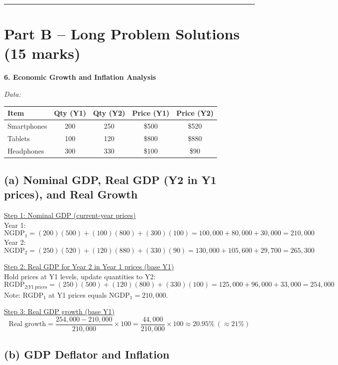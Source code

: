 \documentclass[12pt]{article}
\begin{document}
\vspace{0.5em}
\hrule
\vspace{0.5em}

\section*{Part B – Long Problem Solutions (15 marks)}

\textbf{6. Economic Growth and Inflation Analysis}

\textit{Data:}\\
\begin{tabular}{lcccc}
\toprule
Item & Qty (Y1) & Qty (Y2) & Price (Y1) & Price (Y2) \\
\midrule
Smartphones & 200 & 250 & \$500 & \$520 \\
Tablets     & 100 & 120 & \$800 & \$880 \\
Headphones  & 300 & 330 & \$100 & \$90 \\
\bottomrule
\end{tabular}

\subsection*{(a) Nominal GDP, Real GDP (Y2 in Y1 prices), and Real Growth}

\underline{Step 1: Nominal GDP (current-year prices)} \\
Year 1:
\[
\text{NGDP}_1 = (200)(500) + (100)(800) + (300)(100)
= 100{,}000 + 80{,}000 + 30{,}000 = \boxed{210{,}000}
\]
Year 2:
\[
\text{NGDP}_2 = (250)(520) + (120)(880) + (330)(90)
= 130{,}000 + 105{,}600 + 29{,}700 = \boxed{265{,}300}
\]

\underline{Step 2: Real GDP for Year 2 in Year 1 prices (base Y1)} \\
Hold prices at Y1 levels, update quantities to Y2:
\[
\text{RGDP}_{2|Y1\ \text{prices}} = (250)(500) + (120)(800) + (330)(100)
= 125{,}000 + 96{,}000 + 33{,}000 = \boxed{254{,}000}
\]
Note: $\text{RGDP}_1$ at Y1 prices equals $\text{NGDP}_1 = \boxed{210{,}000}$.

\underline{Step 3: Real GDP growth (base Y1)} \\
\[
\text{Real growth} = \frac{254{,}000 - 210{,}000}{210{,}000}\times 100
= \frac{44{,}000}{210{,}000}\times 100 \approx \boxed{20.95\% \ (\approx 21\%)}
\]

\subsection*{(b) GDP Deflator and Inflation}
\end{document}
